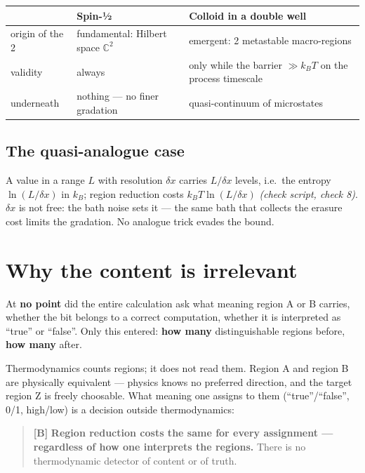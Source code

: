 \begin{center}
\small
\begin{tabular}{@{}p{}p{}p{}@{}}
\toprule
 & \textbf{Spin-½} & \textbf{Colloid in a double well} \\
\midrule
origin of the 2 & fundamental: Hilbert space $\mathbb{C}^2$ & emergent: 2 metastable macro-regions \\
validity & always & only while the barrier $\gg k_B T$ on the process timescale \\
underneath & nothing --- no finer gradation & quasi-continuum of microstates \\
\bottomrule
\end{tabular}
\end{center}

\subsection{The quasi-analogue case}

A value in a range $L$ with resolution $\delta x$ carries $L/\delta x$
levels, i.e.\ the entropy $\ln(L/\delta x)$ in $k_B$; region reduction costs $k_B T \ln(L/\delta x)$ \emph{(check script, check 8)}. $\delta x$
is not free: the bath noise sets it --- the same bath that collects the erasure
cost limits the gradation. No analogue trick evades the bound.

\section{Why the content is irrelevant}
\label{sec:content}

At \textbf{no point} did the entire calculation ask what meaning region A or B
carries, whether the bit belongs to a correct computation, whether it is
interpreted as “true” or “false”. Only this entered: \textbf{how many}
distinguishable regions before, \textbf{how many} after.

Thermodynamics counts regions; it does not read them. Region A and region B are
physically equivalent --- physics knows no preferred direction, and the target
region Z is freely choosable. What meaning one assigns to them
(“true”/“false”, 0/1, high/low) is a decision outside thermodynamics:

\begin{quote}
\textbf{[B]} \textbf{Region reduction costs the same for every assignment --- regardless of
how one interprets the regions.} There is no thermodynamic detector of content or
of truth.
\end{quote}

